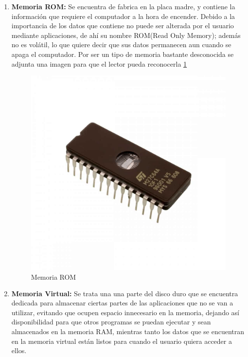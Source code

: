 \documentclass{article}
\begin{document}
\begin{enumerate}
\item \textbf{Memoria ROM:} Se encuentra de fabrica en la placa madre, y contiene la información que requiere el computador a la hora de encender. Debido a la importancia de los datos que contiene no puede ser alterada por el usuario mediante aplicaciones, de ahí su nombre ROM(Read Only Memory); además no es volátil, lo que quiere decir que sus datos permanecen aun cuando se apaga el computador. \cite{tecnologia-informatica} Por ser un tipo de memoria bastante desconocida se adjunta una imagen para que el lector pueda reconocerla \ref{fig:memoria_rom}
    \begin{figure}[h]
        \centering
        \includegraphics[scale=0.15]{Memoria ROM.jpg}
        \caption{Memoria ROM}
        \label{fig:memoria_rom}
    \end{figure}

\item \textbf{Memoria Virtual:} Se trata una una parte del disco duro que se encuentra dedicada para almacenar ciertas partes de las aplicaciones que no se van a utilizar, evitando que ocupen espacio innecesario en la memoria, dejando así disponibilidad para que otros programas se puedan ejecutar y sean almacenados en la memoria RAM, mientras tanto los datos que se encuentran en la memoria virtual están listos para cuando el usuario quiera acceder a ellos.


\end{enumerate}
\end{document}
